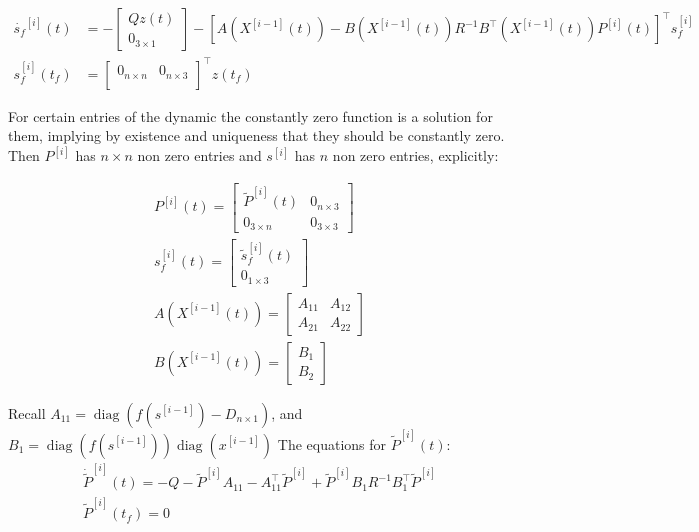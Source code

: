 \documentclass[3p,times]{article}
\DeclareMathOperator{\diag}{diag}
\begin{document}
\begin{align}
\dot{s_f}^{[i]}(t) &= -\begin{bmatrix}Qz(t) \\ 0_{3\times 1} \end{bmatrix}- \left[A\left(X^{[i-1]}(t)\right) -B\left(X^{[i-1]}(t)\right)R^{-1}B^\top \left(X^{[i-1]}(t)\right)P^{[i]}(t) \right]^\top s_f^{[i]} \\
s_f^{[i]}(t_f) &=   \begin{bmatrix}
0_{n\times n}  & 0_{n\times 3} \\
\end{bmatrix}^\top z(t_f)
\end{align}

For certain entries of the dynamic the constantly zero function is a solution for them, implying by existence and uniqueness that they should be constantly zero. Then $P^{[i]}$ has $n\times n$ non zero entries and $s^{[i]}$ has $n$ non zero entries, explicitly:

\begin{align}
P^{[i]}(t) = \begin{bmatrix}
\tilde{P}^{[i]}(t) & 0_{n\times 3} \\ 0_{3 \times n} & 0_{3 \times 3}
\end{bmatrix} \\
s_f^{[i]}(t) = \begin{bmatrix}
\tilde{s}_f^{[i]}(t) \\ 0_{1\times 3}
\end{bmatrix} \\
A\left (X^{[i-1]}(t)\right) = \begin{bmatrix}
A_{11} & A_{12} \\ A_{21} & A_{22}
\end{bmatrix} \\
B\left (X^{[i-1]}(t)\right) = \begin{bmatrix}
B_1 \\ B_2
\end{bmatrix} 
\end{align}


Recall $A_{11} = \diag \left( f\left(s^{[i-1]}\right)- D_{n\times 1} \right)$, and $B_1 = \diag\left(f\left(s^{[i-1]}\right)\right)\diag \left(x^{[i-1]} \right) $ The equations for $\tilde{P}^{[i]}(t)$:
\begin{align}
\dot{\tilde{P}}^{[i]}(t)= -Q- \tilde{P}^{[i]}A_{11} -A_{11}^\top \tilde{P}^{[i]} +  \tilde{P}^{[i]}B_1R^{-1}B_1^\top \tilde{P}^{[i]} \\
\tilde{P}^{[i]}(t_f) = 0
\end{align}
\end{document}
